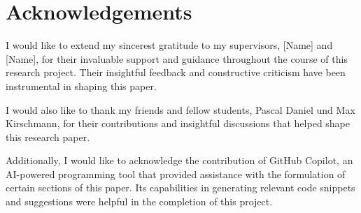 \chapter*{Acknowledgements}
\label{Acknowledgements}

I would like to extend my sincerest gratitude to my supervisors, [Name] and [Name], 
for their invaluable support and guidance throughout the course of this research project.
Their insightful feedback and constructive criticism have been instrumental in shaping this paper.

I would also like to thank my friends and fellow students, Pascal Daniel und Max Kirschmann, 
for their contributions and insightful discussions that helped shape this research paper.

Additionally, I would like to acknowledge the contribution of GitHub Copilot, 
an AI-powered programming tool that provided assistance with the formulation of certain sections of this paper.
Its capabilities in generating relevant code snippets and suggestions were helpful in the completion of this project.